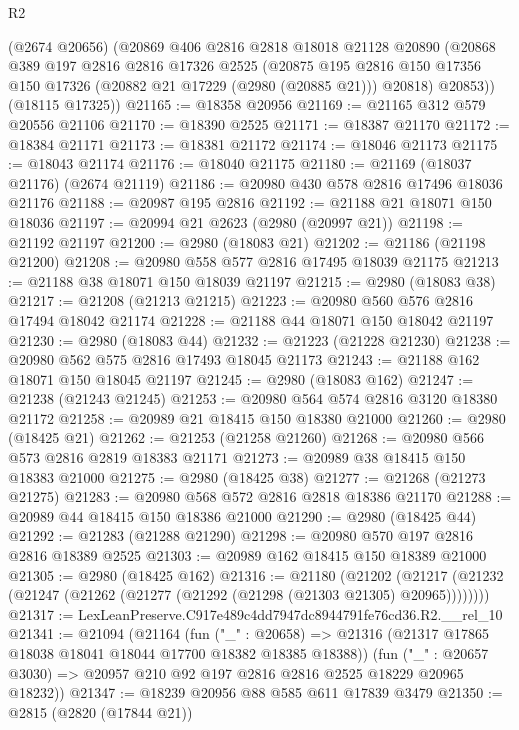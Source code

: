 \begin{lexlean}{R2}
\begin{coremodule}
      (@2674 @20656)
      (@20869
        @406
        @2816
        @2818
        @18018
        @21128
        @20890
        (@20868
          @389
          @197
          @2816
          @2816
          @17326
          @2525
          (@20875
            @195
            @2816
            @150
            @17356
            @150
            @17326
            (@20882 @21 @17229 (@2980 (@20885 @21)))
            @20818)
          @20853))
      (@18115 @17325))
@21165 := @18358 @20956
@21169 := @21165 @312 @579 @20556 @21106
@21170 := @18390 @2525
@21171 := @18387 @21170
@21172 := @18384 @21171
@21173 := @18381 @21172
@21174 := @18046 @21173
@21175 := @18043 @21174
@21176 := @18040 @21175
@21180 := @21169 (@18037 @21176) (@2674 @21119)
@21186 := @20980 @430 @578 @2816 @17496 @18036 @21176
@21188 := @20987 @195 @2816
@21192 := @21188 @21 @18071 @150 @18036
@21197 := @20994 @21 @2623 (@2980 (@20997 @21))
@21198 := @21192 @21197
@21200 := @2980 (@18083 @21)
@21202 := @21186 (@21198 @21200)
@21208 := @20980 @558 @577 @2816 @17495 @18039 @21175
@21213 := @21188 @38 @18071 @150 @18039 @21197
@21215 := @2980 (@18083 @38)
@21217 := @21208 (@21213 @21215)
@21223 := @20980 @560 @576 @2816 @17494 @18042 @21174
@21228 := @21188 @44 @18071 @150 @18042 @21197
@21230 := @2980 (@18083 @44)
@21232 := @21223 (@21228 @21230)
@21238 := @20980 @562 @575 @2816 @17493 @18045 @21173
@21243 := @21188 @162 @18071 @150 @18045 @21197
@21245 := @2980 (@18083 @162)
@21247 := @21238 (@21243 @21245)
@21253 := @20980 @564 @574 @2816 @3120 @18380 @21172
@21258 := @20989 @21 @18415 @150 @18380 @21000
@21260 := @2980 (@18425 @21)
@21262 := @21253 (@21258 @21260)
@21268 := @20980 @566 @573 @2816 @2819 @18383 @21171
@21273 := @20989 @38 @18415 @150 @18383 @21000
@21275 := @2980 (@18425 @38)
@21277 := @21268 (@21273 @21275)
@21283 := @20980 @568 @572 @2816 @2818 @18386 @21170
@21288 := @20989 @44 @18415 @150 @18386 @21000
@21290 := @2980 (@18425 @44)
@21292 := @21283 (@21288 @21290)
@21298 := @20980 @570 @197 @2816 @2816 @18389 @2525
@21303 := @20989 @162 @18415 @150 @18389 @21000
@21305 := @2980 (@18425 @162)
@21316 := @21180
    (@21202 (@21217 (@21232 (@21247 (@21262 (@21277 (@21292 (@21298 (@21303 @21305) @20965))))))))
@21317 := LexLeanPreserve.C917e489c4dd7947dc8944791fe76cd36.R2.__rel_10
@21341 := @21094
    (@21164
      (fun ("_" : @20658) =>
      @21316 (@21317 @17865 @18038 @18041 @18044 @17700 @18382 @18385 @18388))
      (fun ("_" : @20657 @3030) => @20957 @210 @92 @197 @2816 @2816 @2525 @18229 @20965 @18232))
@21347 := @18239 @20956 @88 @585 @611 @17839 @3479
@21350 := @2815 (@2820 (@17844 @21))

\end{coremodule}
\end{lexlean}
